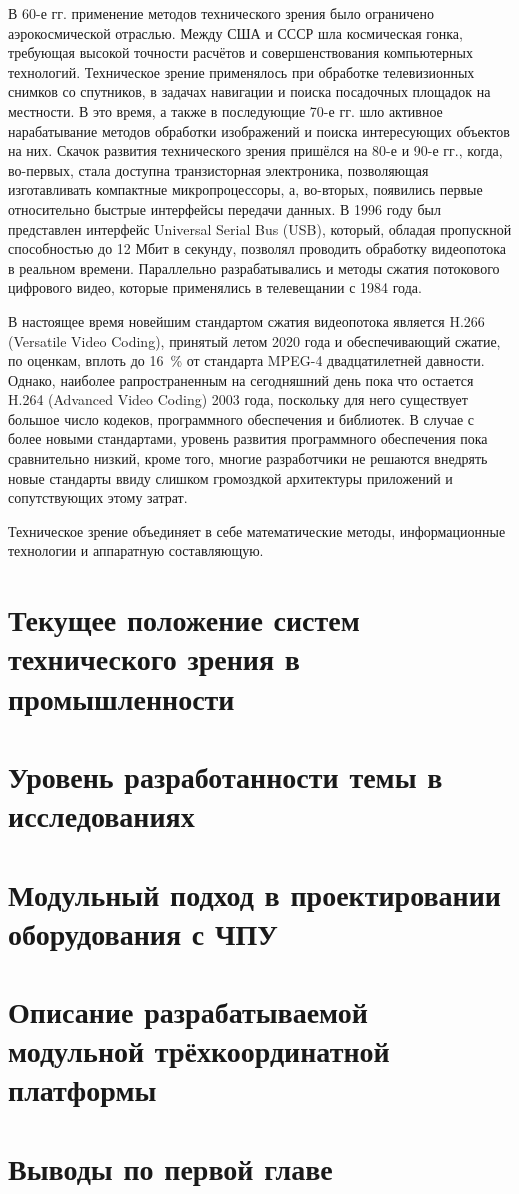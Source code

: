 В 60-е гг. применение методов технического зрения было ограничено аэрокосмической отраслью. Между США и СССР шла космическая гонка, требующая высокой точности расчётов и совершенствования компьютерных технологий. Техническое зрение применялось при обработке телевизионных снимков со спутников, в задачах навигации и поиска посадочных площадок на местности. В это время, а также в последующие 70-е гг. шло активное нарабатывание методов обработки изображений и поиска интересующих объектов на них. Скачок развития технического зрения пришёлся на 80-е и 90-е гг., когда, во-первых, стала доступна транзисторная электроника, позволяющая изготавливать компактные микропроцессоры, а, во-вторых, появились первые относительно быстрые интерфейсы передачи данных. В 1996 году был представлен интерфейс Universal Serial Bus (USB), который, обладая пропускной способностью до 12 Мбит в секунду, позволял проводить обработку видеопотока в реальном времени. Параллельно разрабатывались и методы сжатия потокового цифрового видео, которые применялись в телевещании с 1984 года. 

В настоящее время новейшим стандартом сжатия видеопотока является H.266 (Versatile Video Coding), принятый летом 2020 года и обеспечивающий сжатие, по оценкам, вплоть до 16~\% от стандарта MPEG-4 двадцатилетней давности. Однако, наиболее рапространенным на сегодняшний день пока что остается H.264 (Advanced Video Coding) 2003 года, поскольку для него существует большое число кодеков, программного обеспечения и библиотек. В случае с более новыми стандартами, уровень развития программного обеспечения пока сравнительно низкий, кроме того, многие разработчики не решаются внедрять новые стандарты ввиду слишком громоздкой архитектуры приложений и сопутствующих этому затрат.

Техническое зрение объединяет в себе математические методы, информационные технологии и аппаратную составляющую.

\section{Текущее положение систем технического зрения в промышленности} \label{sect1_2}

\section{Уровень разработанности темы в исследованиях} \label{sect1_3}

\section{Модульный подход в проектировании оборудования с ЧПУ} \label{sect1_4}

\section{Описание разрабатываемой модульной трёхкоординатной платформы} \label{sect1_5}

\section{Выводы по первой главе} \label{sect1_6}
